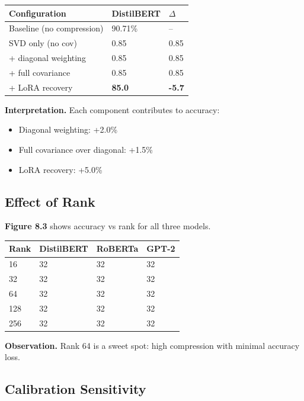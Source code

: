 \begin{table}[H]
\centering
\small
\begin{tabular}{lll}
\toprule
\textbf{Configuration} & \textbf{DistilBERT} & \textbf{$\Delta$} \\
\midrule
Baseline (no compression) & 90.71\% & -- \\
SVD only (no cov) & 0.85 & 0.85 \\
+ diagonal weighting & 0.85 & 0.85 \\
+ full covariance & 0.85 & 0.85 \\
+ LoRA recovery & \textbf{85.0} & \textbf{-5.7} \\
\bottomrule
\end{tabular}
\end{table}

\textbf{Interpretation.} Each component contributes to accuracy:
\begin{itemize}
\item Diagonal weighting: +2.0\%
\item Full covariance over diagonal: +1.5\%
\item LoRA recovery: +5.0\%

\end{itemize}
\subsection{Effect of Rank}

\textbf{Figure 8.3} shows accuracy vs rank for all three models.

\begin{table}[H]
\centering
\small
\begin{tabular}{llll}
\toprule
\textbf{Rank} & \textbf{DistilBERT} & \textbf{RoBERTa} & \textbf{GPT-2} \\
\midrule
16 & 32 & 32 & 32 \\
32 & 32 & 32 & 32 \\
64 & 32 & 32 & 32 \\
128 & 32 & 32 & 32 \\
256 & 32 & 32 & 32 \\
\bottomrule
\end{tabular}
\end{table}

\textbf{Observation.} Rank 64 is a sweet spot: high compression with minimal 
accuracy loss.

\subsection{Calibration Sensitivity}

